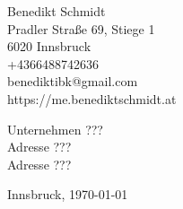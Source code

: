 


\begin{flushleft}
Benedikt Schmidt \\
Pradler Straße 69, Stiege 1 \\
6020 Innsbruck \\
+4366488742636 \\
benediktibk@gmail.com \\
https://me.benediktschmidt.at \\
\end{flushleft}
\begin{flushleft}
Unternehmen ??? \\
Adresse ??? \\
Adresse ??? \\
\end{flushleft}
\begin{flushright}
Innsbruck, \today
\end{flushright}

